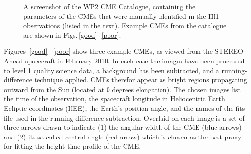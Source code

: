 \documentclass[10pt, a4paper, oneside]{article}
\begin{document}
\begin{figure}[ht]
\caption{A screenshot of the WP2 CME Catalogue, containing the parameters of the CMEs that were manually identified in the HI1 observations (listed in the text). Example CMEs from the catalogue are shown in Figs.\,\ref{good}--\,\ref{poor}.}
\label{catalogue}
\end{figure}


Figures~\ref{good}\,--\,\ref{poor} show three example CMEs, as viewed from the STEREO-Ahead spacecraft in February 2010. In each case the images have been processed to level 1 quality science data, a background has been subtracted, and a running-difference technique applied. CMEs therefor appear as bright regions propagating outward from the Sun (located at 0 degrees elongation). The chosen images list the time of the observation, the spacecraft longitude in Heliocentric Earth Ecliptic coordinates (HEE), the Earth's position angle, and the names of the fits file used in the running-difference subtraction. Overlaid on each image is a set of three arrows drawn to indicate (1) the angular width of the CME (blue arrows) and (2) its so-called central angle (red arrow) which is chosen as the best proxy for fitting the height-time profile of the CME.
\end{document}
